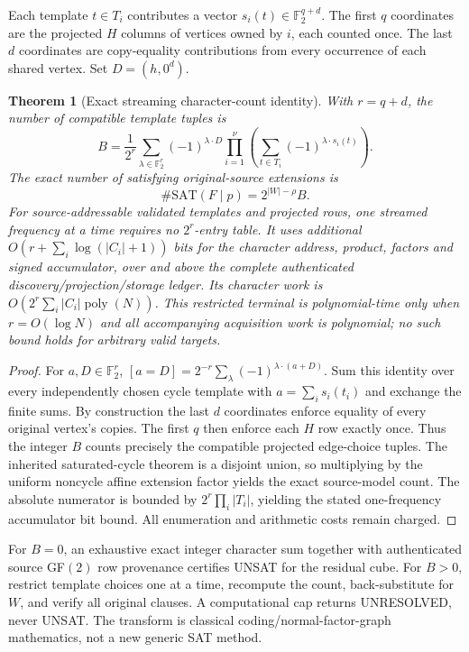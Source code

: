 \documentclass[11pt]{article}
\newtheorem{theorem}{Theorem}
\begin{document}
Each template $t\in T_i$ contributes a vector $s_i(t)\in\mathbb F_2^{q+d}$. The first $q$ coordinates are the projected $H$ columns of vertices owned by $i$, each counted once. The last $d$ coordinates are copy-equality contributions from every occurrence of each shared vertex. Set $D=(h,0^d)$.

\begin{theorem}[Exact streaming character-count identity]
With $r=q+d$, the number of compatible template tuples is
\[
B=\frac{1}{2^r}\sum_{\lambda\in\mathbb F_2^r}
(-1)^{\lambda\cdot D}\prod_{i=1}^{\nu}
\left(\sum_{t\in T_i}(-1)^{\lambda\cdot s_i(t)}\right).
\]
The exact number of satisfying original-source extensions is
\[
\#\mathrm{SAT}(F\mid p)=2^{|W|-\rho}B.
\]
For source-addressable validated templates and projected rows, one streamed frequency at a time requires no $2^r$-entry table. It uses additional $O(r+\sum_i\log(|C_i|+1))$ bits for the character address, product, factors and signed accumulator, over and above the complete authenticated discovery/projection/storage ledger. Its character work is $O(2^r\sum_i|C_i|\operatorname{poly}(N))$. This restricted terminal is polynomial-time only when $r=O(\log N)$ and all accompanying acquisition work is polynomial; no such bound holds for arbitrary valid targets.
\end{theorem}
\begin{proof}
For $a,D\in\mathbb F_2^r$,
$[a=D]=2^{-r}\sum_{\lambda}(-1)^{\lambda\cdot(a+D)}$.
Sum this identity over every independently chosen cycle template with
$a=\sum_i s_i(t_i)$ and exchange the finite sums. By construction the last $d$ coordinates enforce equality of every original vertex's copies. The first $q$ then enforce each $H$ row exactly once. Thus the integer $B$ counts precisely the compatible projected edge-choice tuples. The inherited saturated-cycle theorem is a disjoint union, so multiplying by the uniform noncycle affine extension factor yields the exact source-model count. The absolute numerator is bounded by $2^r\prod_i|T_i|$, yielding the stated one-frequency accumulator bit bound. All enumeration and arithmetic costs remain charged.
\end{proof}

For $B=0$, an exhaustive exact integer character sum together with authenticated source GF$(2)$ row provenance certifies UNSAT for the residual cube. For $B>0$, restrict template choices one at a time, recompute the count, back-substitute for $W$, and verify all original clauses. A computational cap returns UNRESOLVED, never UNSAT. The transform is classical coding/normal-factor-graph mathematics, not a new generic SAT method.
\end{document}
